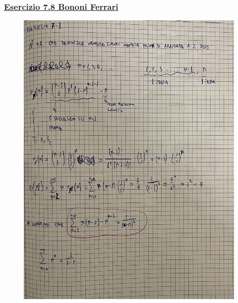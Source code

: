 \documentclass{article}
\begin{document}
\subsubsection{\underline{Esercizio 7.8 Bononi Ferrari}}
\begin{figure}[ht]
\centering
\includegraphics[scale=0.10]{ese/38.jpeg}
\end{figure}
\end{document}
